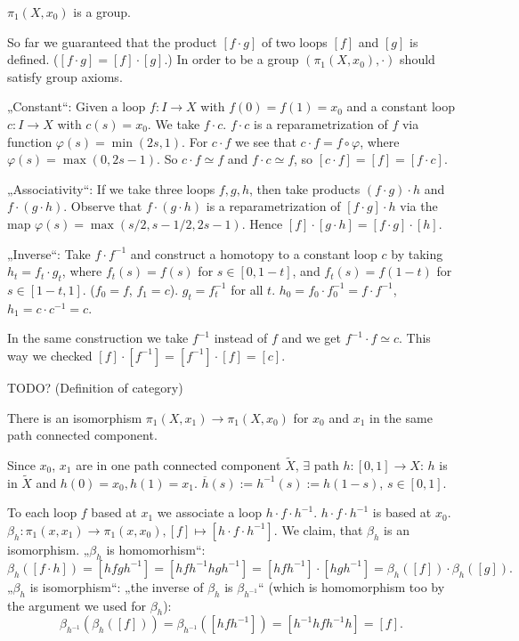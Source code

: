 \documentclass[12pt]{article}					%
\begin{document}
\begin{tvrzeni}
	$π_1(X, x_0)$ is a group.

	\begin{dukazin}
		So far we guaranteed that the product $[f·g]$ of two loops $[f]$ and $[g]$ is defined. ($[f·g] = [f]·[g]$.) In order to be a group $(π_1(X, x_0), ·)$ should satisfy group axioms.

		„Constant“: Given a loop $f: I \rightarrow X$ with $f(0) = f(1) = x_0$ and a constant loop $c: I \rightarrow X$ with $c(s) = x_0$. We take $f·c$. $f·c$ is a reparametrization of $f$ via function $φ(s) = \min(2s, 1)$. For $c·f$ we see that $c·f = f ∘ φ$, where $φ(s) = \max(0, 2s - 1)$. So $c·f \simeq f$ and $f·c \simeq f$, so $[c·f] = [f] = [f·c]$.

		„Associativity“: If we take three loops $f, g, h$, then take products $(f·g)·h$ and $f·(g·h)$. Observe that $f·(g·h)$ is a reparametrization of $[f·g]·h$ via the map $φ(s) = \max(s / 2, s - 1 / 2, 2s - 1)$. Hence $[f]·[g·h] = [f·g]·[h]$.

		„Inverse“: Take $f·f^{-1}$ and construct a homotopy to a constant loop $c$ by taking $h_t = f_t · g_t$, where $f_t(s) = f(s)$ for $s \in [0, 1 - t]$, and $f_t(s) = f(1 - t)$ for $s \in [1 - t, 1]$. ($f_0 = f$, $f_1 = c$). $g_t = f_t^{-1}$ for all $t$. $h_0 = f_0·f_0^{-1} = f·f^{-1}$, $h_1 = c·c^{-1} = c$.

		In the same construction we take $f^{-1}$ instead of $f$ and we get $f^{-1}·f \simeq c$. This way we checked $[f]·[f^{-1}] = [f^{-1}]·[f] = [c]$.
	\end{dukazin}
\end{tvrzeni}

TODO? (Definition of category)


\begin{tvrzeni}
	There is an isomorphism $π_1(X, x_1) \rightarrow π_1(X, x_0)$ for $x_0$ and $x_1$ in the same path connected component.

	\begin{dukazin}
		Since $x_0$, $x_1$ are in one path connected component $\tilde X$, $\exists$ path $h: [0, 1] \rightarrow X$: $h$ is in $\tilde X$ and $h(0) = x_0, h(1) = x_1$. $\overline{h}(s) := h^{-1}(s) := h(1 - s)$, $s \in [0, 1]$.

		To each loop $f$ based at $x_1$ we associate a loop $h·f·h^{-1}$. $h·f·h^{-1}$ is based at $x_0$. $β_h : π_1(x, x_1) \rightarrow π_1(x, x_0), [f] \mapsto [h·f·h^{-1}]$. We claim, that $β_h$ is an isomorphism. „$β_h$ is homomorhism“:
		$$ β_h([f·h]) = [hfgh^{-1}] = [hfh^{-1} hgh^{-1}] = [hfh^{-1}]·[hgh^{-1}] = β_h([f])·β_h([g]). $$
		„$β_h$ is isomorphism“: „the inverse of $β_h$ is $β_{h^{-1}}$“ (which is homomorphism too by the argument we used for $β_h$):
		$$ β_{h^{-1}}(β_h([f])) = β_{h^{-1}}([hfh^{-1}]) = [h^{-1}hfh^{-1}h] = [f]. $$
	\end{dukazin}
\end{tvrzeni}
\end{document}
